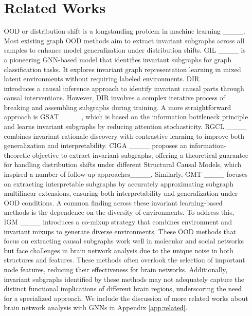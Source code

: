 \section{Related Works}

OOD or distribution shift is a longstanding problem in machine learning ____. Most existing graph OOD methods aim to extract invariant subgraphs across all samples to enhance model generalization under distribution shifts. GIL ____ is a pioneering GNN-based model that identifies invariant subgraphs for graph classification tasks. It explores invariant graph representation learning in mixed latent environments without requiring labeled environments. DIR ____ introduces a causal inference approach to identify invariant causal parts through causal interventions. However, DIR involves a complex iterative process of breaking and assembling subgraphs during training. A more straightforward approach is GSAT ____, which is based on the information bottleneck principle and learns invariant subgraphs by reducing attention stochasticity. RGCL ____ combines invariant rationale discovery with contrastive learning to improve both generalization and interpretability. CIGA ____ proposes an information-theoretic objective to extract invariant subgraphs, offering a theoretical guarantee for handling distribution shifts under different Structural Causal Models, which inspired a number of follow-up approaches____. Similarly, GMT ____ focuses on extracting interpretable subgraphs by accurately approximating subgraph multilinear extensions, ensuring both interpretability and generalization under OOD conditions.  A common finding across these invariant learning-based methods is the dependence on the diversity of environments. To address this, IGM ____ introduces a co-mixup strategy that combines environment and invariant mixups to generate diverse environments. These OOD methods that focus on extracting causal subgraphs work well in molecular and social networks but face challenges in brain network analysis due to the unique noise in both structures and features. These methods often overlook the selection of important node features, reducing their effectiveness for brain networks. Additionally, invariant subgraphs identified by these methods may not adequately capture the distinct functional implications of different brain regions, underscoring the need for a specialized approach. We include the discussion of more related works about brain network analysis with GNNs in Appendix \ref{app:related}.


